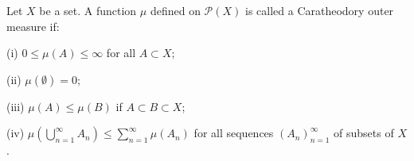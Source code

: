 Let $X$ be a set. A function $\mu$ defined on $\mathcal{P}(X)$ is called a Caratheodory outer measure if:

(i) $0 \leq \mu(A) \leq \infty$ for all $A \subset X$;

(ii) $\mu(\emptyset) = 0$;

(iii) $\mu(A) \leq \mu(B)$ if $A \subset B \subset X$;

(iv) $\mu\left(\bigcup_{n=1}^{\infty} A_n\right) \leq \sum_{n=1}^{\infty} \mu(A_n)$ for all sequences $(A_n)_{n=1}^{\infty}$ of subsets of $X$.